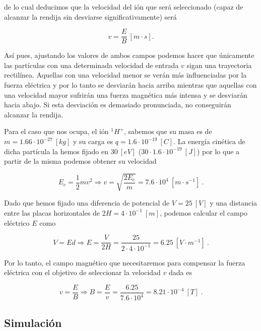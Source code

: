 \documentclass[journal]{IEEEtran}
\begin{document}
de lo cual deducimos que la velocidad del ión que será seleccionado (capaz de alcanzar la rendija sin desviarse significativamente) será

\begin{equation}
    v = \displaystyle\frac{E}{B}~[m\cdot s].
\end{equation}

Así pues, ajustando los valores de ambos campos podemos hacer que únicamente las partículas con una determinada velocidad de entrada $v$ sigan una trayectoria rectilínea. Aquellas con una velocidad menor se verán más influenciadas por la fuerza eléctrica y por lo tanto se desviarán hacia arriba mientras que aquellas con una velocidad mayor sufrirán una fuerza magnética más intensa y se desviarán hacia abajo. Si esta desviación es demasiado pronunciada, no conseguirán alcanzar la rendija.

Para el caso que nos ocupa, el ión $^1H^+$, sabemos que su masa es de $m = 1.66\cdot 10^{-27}~[kg]$ y su carga es $q = 1.6 \cdot 10^{-19}~[C]$. La energía cinética de dicha partícula la hemos fijado en $30~[eV]$ ($30\cdot 1.6\cdot 10^{-19}~[J]$) por lo que a partir de la misma podemos obtener su velocidad

\begin{equation}
    E_c = \displaystyle\frac{1}{2}mv^2 \Rightarrow v = \sqrt{\displaystyle\frac{2E_c}{m}} = 7.6\cdot 10^4~[m\cdot s^{-1}]~.
\end{equation}

Dado que hemos fijado una diferencia de potencial de $V = 25~[V]$ y una distancia entre las placas horizontales de $2H = 4\cdot 10^{-1}~[m]$, podemos calcular el campo eléctrico $E$ como

\begin{equation}
    V = Ed \Rightarrow E = \displaystyle\frac{V}{2H} = \displaystyle\frac{25}{2\cdot 4\cdot 10^{-1}} = 6.25~[V\cdot m^{-1}]~.
\end{equation}

Por lo tanto, el campo magnético que necesitaremos para compensar la fuerza eléctrica con el objetivo de seleccionar la velocidad $v$ dada es

\begin{equation}
    v = \displaystyle\frac{E}{B} \Rightarrow B = \displaystyle\frac{E}{v} = \displaystyle\frac{6.25}{7.6\cdot 10^4} = 8.21 \cdot 10^{-4}~[T]~.
\end{equation}

\subsection{Simulación}
\end{document}
